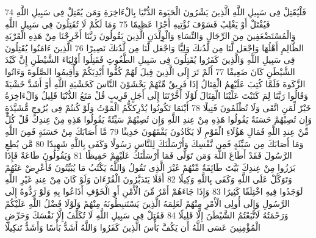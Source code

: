 \documentclass[20pt,a4paper]{article}
\begin{document}
{\tiny\colorbox{cl_aya}{74}} فَلْيُقَتِلْ فِى سَبِيلِ اللَّهِ الَّذِينَ يَشْرُونَ الْحَيَوةَ الدُّنْيَا بِالْءَاخِرَةِ وَمَن يُقَتِلْ فِى سَبِيلِ اللَّهِ فَيُقْتَلْ أَوْ يَغْلِبْ فَسَوْفَ نُؤْتِيهِ أَجْرًا عَظِيمًا
{\tiny\colorbox{cl_aya}{75}} وَمَا لَكُمْ لَا تُقَتِلُونَ فِى سَبِيلِ اللَّهِ وَالْمُسْتَضْعَفِينَ مِنَ الرِّجَالِ وَالنِّسَاءِ وَالْوِلْدَنِ الَّذِينَ يَقُولُونَ رَبَّنَا أَخْرِجْنَا مِنْ هَذِهِ الْقَرْيَةِ الظَّالِمِ أَهْلُهَا وَاجْعَل لَّنَا مِن لَّدُنكَ وَلِيًّا وَاجْعَل لَّنَا مِن لَّدُنكَ نَصِيرًا
{\tiny\colorbox{cl_aya}{76}} الَّذِينَ ءَامَنُوا يُقَتِلُونَ فِى سَبِيلِ اللَّهِ وَالَّذِينَ كَفَرُوا يُقَتِلُونَ فِى سَبِيلِ الطَّغُوتِ فَقَتِلُوا أَوْلِيَاءَ الشَّيْطَنِ إِنَّ كَيْدَ الشَّيْطَنِ كَانَ ضَعِيفًا
{\tiny\colorbox{cl_aya}{77}} أَلَمْ تَرَ إِلَى الَّذِينَ قِيلَ لَهُمْ كُفُّوا أَيْدِيَكُمْ وَأَقِيمُوا الصَّلَوةَ وَءَاتُوا الزَّكَوةَ فَلَمَّا كُتِبَ عَلَيْهِمُ الْقِتَالُ إِذَا فَرِيقٌ مِّنْهُمْ يَخْشَوْنَ النَّاسَ كَخَشْيَةِ اللَّهِ أَوْ أَشَدَّ خَشْيَةً وَقَالُوا رَبَّنَا لِمَ كَتَبْتَ عَلَيْنَا الْقِتَالَ لَوْلَا أَخَّرْتَنَا إِلَى أَجَلٍ قَرِيبٍ قُلْ مَتَعُ الدُّنْيَا قَلِيلٌ وَالْءَاخِرَةُ خَيْرٌ لِّمَنِ اتَّقَى وَلَا تُظْلَمُونَ فَتِيلًا
{\tiny\colorbox{cl_aya}{78}} أَيْنَمَا تَكُونُوا يُدْرِككُّمُ الْمَوْتُ وَلَوْ كُنتُمْ فِى بُرُوجٍ مُّشَيَّدَةٍ وَإِن تُصِبْهُمْ حَسَنَةٌ يَقُولُوا هَذِهِ مِنْ عِندِ اللَّهِ وَإِن تُصِبْهُمْ سَيِّئَةٌ يَقُولُوا هَذِهِ مِنْ عِندِكَ قُلْ كُلٌّ مِّنْ عِندِ اللَّهِ فَمَالِ هَؤُلَاءِ الْقَوْمِ لَا يَكَادُونَ يَفْقَهُونَ حَدِيثًا
{\tiny\colorbox{cl_aya}{79}} مَّا أَصَابَكَ مِنْ حَسَنَةٍ فَمِنَ اللَّهِ وَمَا أَصَابَكَ مِن سَيِّئَةٍ فَمِن نَّفْسِكَ وَأَرْسَلْنَكَ لِلنَّاسِ رَسُولًا وَكَفَى بِاللَّهِ شَهِيدًا
{\tiny\colorbox{cl_aya}{80}} مَّن يُطِعِ الرَّسُولَ فَقَدْ أَطَاعَ اللَّهَ وَمَن تَوَلَّى فَمَا أَرْسَلْنَكَ عَلَيْهِمْ حَفِيظًا
{\tiny\colorbox{cl_aya}{81}} وَيَقُولُونَ طَاعَةٌ فَإِذَا بَرَزُوا مِنْ عِندِكَ بَيَّتَ طَائِفَةٌ مِّنْهُمْ غَيْرَ الَّذِى تَقُولُ وَاللَّهُ يَكْتُبُ مَا يُبَيِّتُونَ فَأَعْرِضْ عَنْهُمْ وَتَوَكَّلْ عَلَى اللَّهِ وَكَفَى بِاللَّهِ وَكِيلًا
{\tiny\colorbox{cl_aya}{82}} أَفَلَا يَتَدَبَّرُونَ الْقُرْءَانَ وَلَوْ كَانَ مِنْ عِندِ غَيْرِ اللَّهِ لَوَجَدُوا فِيهِ اخْتِلَفًا كَثِيرًا
{\tiny\colorbox{cl_aya}{83}} وَإِذَا جَاءَهُمْ أَمْرٌ مِّنَ الْأَمْنِ أَوِ الْخَوْفِ أَذَاعُوا بِهِ وَلَوْ رَدُّوهُ إِلَى الرَّسُولِ وَإِلَى أُولِى الْأَمْرِ مِنْهُمْ لَعَلِمَهُ الَّذِينَ يَسْتَنبِطُونَهُ مِنْهُمْ وَلَوْلَا فَضْلُ اللَّهِ عَلَيْكُمْ وَرَحْمَتُهُ لَاتَّبَعْتُمُ الشَّيْطَنَ إِلَّا قَلِيلًا
{\tiny\colorbox{cl_aya}{84}} فَقَتِلْ فِى سَبِيلِ اللَّهِ لَا تُكَلَّفُ إِلَّا نَفْسَكَ وَحَرِّضِ الْمُؤْمِنِينَ عَسَى اللَّهُ أَن يَكُفَّ بَأْسَ الَّذِينَ كَفَرُوا وَاللَّهُ أَشَدُّ بَأْسًا وَأَشَدُّ تَنكِيلًا
\end{document}
